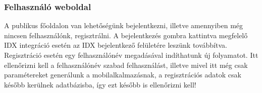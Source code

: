 \subsubsection{Felhasználó weboldal}
A publikus főoldalon van lehetőségünk bejelentkezni, illetve amennyiben még nincsen felhasználónk, regisztrálni. A bejelentkezés gombra kattintva megfelelő IDX integráció esetén az IDX bejelentkező felületére leszünk továbbítva. Regisztráció esetén egy felhasználónév megadásával indíthatunk új folyamatot. Itt ellenőrizni kell a felhasználónév szabad felhasználást, illetve mivel itt még csak paramétereket generálunk a mobilalkalmazásnak, a regisztrációs adatok csak később kerülnek adatbázisba, így ezt később is ellenőrizni kell!